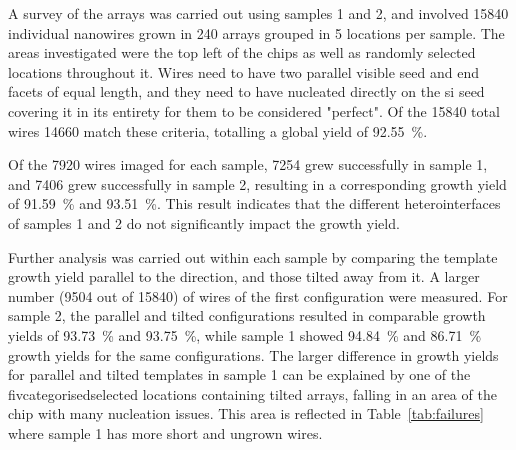 A survey of the arrays was carried out using samples 1 and 2, and involved \num{15840} individual nanowires grown in \num{240} arrays grouped in \num{5} locations per sample. The areas investigated were the top left of the chips as well as randomly selected locations throughout it. Wires need to have two parallel visible  seed and end facets of equal length, and they need to have nucleated directly on the \acs{si} seed covering it in its entirety for them to be considered "perfect". Of the \num{15840} total wires \num{14660} match these criteria, totalling a global yield of \qty{92.55}{\%}.
\par
Of the \num{7920} wires imaged for each sample, \num{7254} grew successfully in sample 1, and \num{7406} grew successfully in sample 2, resulting in a corresponding growth yield of \qty{91.59}{\%} and \qty{93.51}{\%}. This result indicates that the different heterointerfaces of samples 1 and 2 do not significantly impact the growth yield. 
\par
Further analysis was carried out within each sample by comparing the template growth yield parallel to the  direction, and those tilted away from it. A larger number (\num{9504} out of \num{15840}) of wires of the first configuration were measured. For sample 2, the parallel and tilted configurations resulted in comparable growth yields of \qty{93.73}{\%} and \qty{93.75}{\%}, while sample 1 showed \qty{94.84}{\%} and \qty{86.71}{\%} growth yields for the same configurations. The larger difference in growth yields for parallel and tilted templates in sample 1 can be explained by one of the fivcategorisedselected locations containing tilted arrays, falling in an area of the chip with many nucleation issues. This area is reflected in Table~\ref{tab:failures} where sample 1 has more short and ungrown wires.
\par
